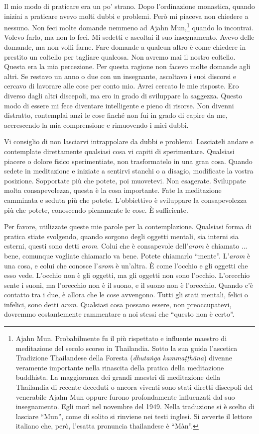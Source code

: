 Il mio modo di praticare era un po' strano. Dopo l'ordinazione
monastica, quando iniziai a praticare avevo molti dubbi e problemi. Però
mi piaceva non chiedere a nessuno. Non feci molte domande nemmeno ad
Ajahn Mun,\footnote{Ajahn Mun. Probabilmente fu il più rispettato e
  influente maestro di meditazione del secolo scorso in Thailandia.
  Sotto la sua guida l'ascetica Tradizione Thailandese della Foresta
  (\emph{dhutaṅga kammaṭṭhāna}) divenne veramente importante nella
  rinascita della pratica della meditazione buddhista. La maggioranza
  dei grandi maestri di meditazione della Thailandia di recente deceduti
  o ancora viventi sono stati diretti discepoli del venerabile Ajahn Mun
  oppure furono profondamente influenzati dal suo insegnamento. Egli
  morì nel novembre del 1949. Nella traduzione si è scelto di lasciare
  ``Mun'', come di solito si rinviene nei testi inglesi. Si avverte il
  lettore italiano che, però, l'esatta pronuncia thailandese è ``Màn''.}
quando lo incontrai. Volevo farlo, ma non lo feci. Mi sedetti e ascoltai
il suo insegnamento. Avevo delle domande, ma non volli farne. Fare
domande a qualcun altro è come chiedere in prestito un coltello per
tagliare qualcosa. Non avremo mai il nostro coltello. Questa era la mia
percezione. Per questa ragione non facevo molte domande agli altri. Se
restavo un anno o due con un insegnante, ascoltavo i suoi discorsi e
cercavo di lavorare alle cose per conto mio. Avrei cercato le mie
risposte. Ero diverso dagli altri discepoli, ma ero in grado di
sviluppare la saggezza. Questo modo di essere mi fece diventare
intelligente e pieno di risorse. Non divenni distratto, contemplai anzi
le cose finché non fui in grado di capire da me, accrescendo la mia
comprensione e rimuovendo i miei dubbi.

Vi consiglio di non lasciarvi intrappolare da dubbi e problemi.
Lasciateli andare e contemplate direttamente qualsiasi cosa vi capiti di
sperimentare. Qualsiasi piacere o dolore fisico sperimentiate, non
trasformatelo in una gran cosa. Quando sedete in meditazione e iniziate
a sentirvi stanchi o a disagio, modificate la vostra posizione.
Sopportate più che potete, poi muovetevi. Non esagerate. Sviluppate
molta consapevolezza, questa è la cosa importante. Fate la meditazione
camminata e seduta più che potete. L'obbiettivo è sviluppare la
consapevolezza più che potete, conoscendo pienamente le cose. È
sufficiente.

Per favore, utilizzate queste mie parole per la contemplazione.
Qualsiasi forma di pratica stiate svolgendo, quando sorgono degli
oggetti mentali, sia interni sia esterni, questi sono detti \emph{arom}.
Colui che è consapevole dell'\emph{arom} è chiamato ... bene, comunque
vogliate chiamarlo va bene. Potete chiamarlo ``mente''. L'\emph{arom} è
una cosa, e colui che conosce l'\emph{arom} è un'altra. È come l'occhio
e gli oggetti che esso vede. L'occhio non è gli oggetti, ma gli oggetti
non sono l'occhio. L'orecchio sente i suoni, ma l'orecchio non è il
suono, e il suono non è l'orecchio. Quando c'è contatto tra i due, è
allora che le cose avvengono. Tutti gli stati mentali, felici o
infelici, sono detti \emph{arom}. Qualsiasi cosa possano essere, non
preoccupatevi, dovremmo costantemente rammentare a noi stessi che
``questo non è certo''.

